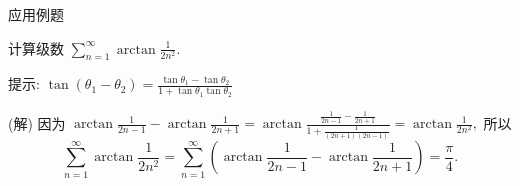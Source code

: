 
\begin{frame}{应用例题}

\begin{eg}
\begin{center}
计算级数 $\sum\limits_{n=1}^\infty \arctan \frac{1}{2n^2}.$
\end{center}
\end{eg}

\alert{提示:} $\tan(\theta_1 - \theta_2) = \frac{\tan\theta_1 - \tan\theta_2}{1 + \tan\theta_1 \tan\theta_2}$

\pause
\vspace*{1em}

\startproof[bg=yellow, fg=red](解)
因为 $\arctan\frac{1}{2n-1} - \arctan\frac{1}{2n+1} = \arctan\frac{\frac{1}{2n-1} - \frac{1}{2n+1}}{1 + \frac{1}{(2n+1)(2n-1)}} = \arctan\frac{1}{2n^2},$ 所以
\[
\sum\limits_{n=1}^\infty \arctan \frac{1}{2n^2} = \sum\limits_{n=1}^\infty \left( \arctan\frac{1}{2n-1} - \arctan\frac{1}{2n+1} \right) = \frac{\pi}{4}.
\]

\end{frame}






